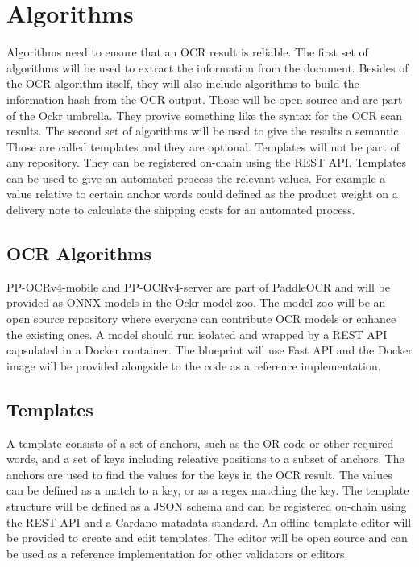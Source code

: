 \documentclass[../ockr-specification.tex]{subfiles}
\begin{document}
\section{Algorithms}

Algorithms need to ensure that an OCR result is reliable. The first set of algorithms will be used to extract the information from the document. Besides of the OCR algorithm itself, they will also include algorithms to build the information hash from the OCR output. Those will be open source and are part of the Ockr umbrella. They provive something like the syntax for the OCR scan results. The second set of algorithms will be used to give the results a semantic. Those are called templates and they are optional. Templates will not be part of any repository. They can be registered on-chain using the REST API. Templates can be used to give an automated process the relevant values. For example a value relative to certain anchor words could defined as the product weight on a delivery note to calculate the shipping costs for an automated process.

\subsection{OCR Algorithms}

PP-OCRv4-mobile and PP-OCRv4-server are part of PaddleOCR and will be provided as ONNX models in the Ockr model zoo. The model zoo will be an open source repository where everyone can contribute OCR models or enhance the existing ones. A model should run isolated and wrapped by a REST API capsulated in a Docker container. The blueprint will use Fast API and the Docker image will be provided alongside to the code as a reference implementation.

\subsection{Templates}

A template consists of a set of anchors, such as the OR code or other required words, and a set of keys including releative positions to a subset of anchors. The anchors are used to find the values for the keys in the OCR result. The values can be defined as a match to a key, or as a regex matching the key. The template structure will be defined as a JSON schema and can be registered on-chain using the REST API and a Cardano matadata standard. An offline template editor will be provided to create and edit templates. The editor will be open source and can be used as a reference implementation for other validators or editors.
\end{document}
